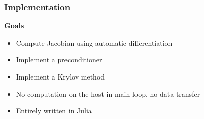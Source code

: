 \begin{frame}
  \frametitle{Implementation}
  {\bf Goals}
  \begin{itemize}
    \item Compute Jacobian using automatic differentiation
    \item Implement a preconditioner
    \item Implement a Krylov method
    \item No computation on the host in main loop, no data transfer
    \item Entirely written in Julia
  \end{itemize}
\end{frame}



